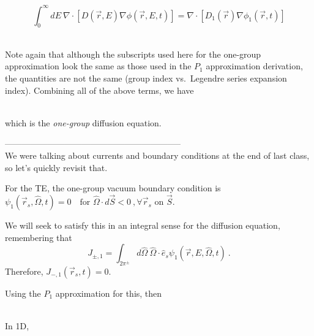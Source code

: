 \documentclass[12pt]{article}
\newif\ifeqns
\newcommand{\rvec}{\ensuremath{\vec{r}}}
\newcommand{\omvec}{\ensuremath{\hat{\Omega}}}
\begin{document}
\begin{equation*}
\int_0^{\infty}dE\:\nabla\cdot[D(\rvec,E)\nabla\phi(\rvec,E,t)]=\nabla\cdot[D_1(\rvec)\nabla\phi_1(\rvec,t)]
\end{equation*}
\else
\vspace*{25em}\\
\fi

Note again that although the subscripts used here for the one-group approximation look the same as those used in
the $P_1$ approximation derivation, the quantities are not the same (group index vs.\ Legendre series expansion index). Combining all of the above terms, we
have
\ifeqns
\begin{equation*}
\frac{1}{v_1}\frac{\partial \phi_1(\rvec,t)}{\partial t} = S_1(\rvec,t) - 
\Sigma_{a,1}(\rvec)\phi_1(\rvec,t) + \nabla\cdot[D_1(\rvec)\nabla\phi_1(\rvec,t)]\:,
\end{equation*}
\else
\vspace*{4em}\\
\fi
which is the \emph{one-group} diffusion equation.

--------------------------------------------------------------\\
We were talking about currents and boundary conditions at the end of last class, so let's quickly revisit that. 

For the TE, the one-group vacuum boundary condition is $\psi_1 (\vec{r}_s, \omvec, t) = 0 \quad \text{for }\omvec \cdot d\vec{S} < 0\:, \forall \rvec_s \text{ on } \vec{S}$.

We will seek to satisfy this in an integral sense for the diffusion equation, remembering that
\begin{equation*}
J_{\pm,1} = \int_{2\pi^{\pm}}d\omvec\:\omvec\cdot\hat{e}_s\psi_1(\rvec,E,\omvec,t)\:.
\end{equation*}
Therefore, $J_{-,1}(\rvec_s,t) = 0$.

Using the $P_1$ approximation for this, then
\ifeqns
\[J_{-,1} = \int_{2\pi^{-}}d\omvec\:\omvec\cdot\hat{e}_s\psi_1(\rvec,E,\omvec,t) \approx \frac{1}{4}\phi_1(\rvec, t) + \frac{D_1(\rvec)}{2}\hat{e}_s \cdot \nabla \phi_1(\rvec, t) = 0\:.\]
\else
\vspace*{3em}\\
\fi

In 1D,
\ifeqns
\begin{align*}
J_{-,1}(z_s,t) &= \frac{1}{4}\phi_1(z_s,t) + \frac{D_1(z_s)}{2}\frac{d\phi_1(z_s,t)}{dz}\Bigr|_{z_s} = 0\\
%
&\frac{d\phi_1(z_s,t)}{dz}\Bigr|_{z_s} = \frac{-\phi_1(z_s,t)}{2D_1(z_s)}
\end{align*}
\else
\vspace*{7em}\\
\fi
\end{document}
